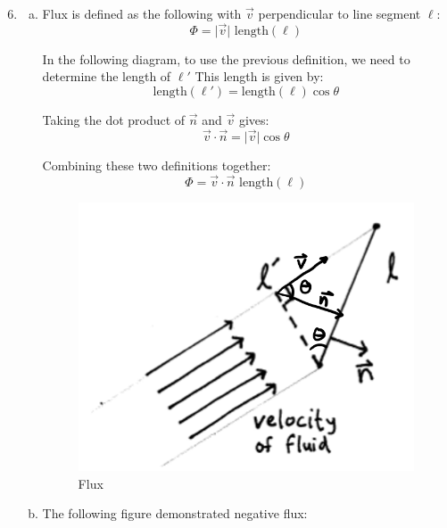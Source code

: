 \documentclass{article}
\begin{document}
\begin{enumerate}[1.]
  \setcounter{enumi}{5}
  \item \begin{enumerate}[a.]
      \item Flux is defined as the following with $\vec{v}$ perpendicular to
        line segment $\ell$:
        $$ \Phi = \vert \vec{v} \vert \textrm{ length}(\ell) $$

        In the following diagram, to use the previous definition, we need to
        determine the length of $\ell'$ This length is given by:
        $$ \textrm{length}(\ell') = \textrm{length}(\ell) \cos \theta $$

        Taking the dot product of $\vec{n}$ and $\vec{v}$ gives:
        $$ \vec{v} \cdot \vec{n} = \vert \vec{v} \vert \cos \theta $$

        Combining these two definitions together:
        $$ \Phi = \vec{v} \cdot \vec{n} \textrm{ length}(\ell) $$

        \begin{figure}[H]
          \centering
          \includegraphics[scale=0.70]{"Flux"}
          \caption{Flux}
        \end{figure}
      \item The following figure demonstrated negative flux:


\end{enumerate}
\end{enumerate}
\end{document}
